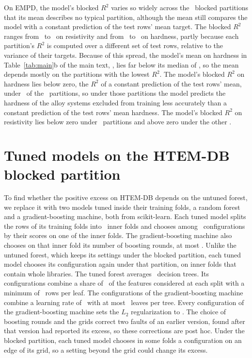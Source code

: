 \documentclass[11pt]{article}
\begin{document}
On EMPD, the model's blocked $R^2$ varies so widely across the \splitDraws\
blocked partitions that its mean describes no typical partition, although the
mean still compares the model with a constant prediction of the test rows' mean
target. The blocked $R^2$ ranges from \empdResBlockedMin\ to
\empdResBlockedMax\ on resistivity and from \empdHardBlockedMin\ to
\empdHardBlockedMax\ on hardness, partly because each partition's $R^2$ is
computed over a different set of test rows, relative to the variance of their
targets. Because of this spread, the model's mean on hardness in
Table~\ref{tab:main}b of the main text, \empdHardBlocked, lies far below its
median of \empdHardBlockedMedian, so the mean depends mostly on the partitions
with the lowest $R^2$. The model's blocked $R^2$ on hardness lies below zero, the
$R^2$ of a constant prediction of the test rows' mean, under
\empdHardBlockedNegative\ of the \splitDraws\ partitions, so under those
partitions the model predicts the hardness of the alloy systems excluded from
training less accurately than a constant prediction of the test rows' mean
hardness. The model's blocked $R^2$ on resistivity lies below zero under
\empdResBlockedNegative\ partitions and above zero under the other
\empdResBlockedPositive.

\section{Tuned models on the HTEM-DB blocked partition}
\label{sec:esi-posthoc}

To find whether the positive excess on HTEM-DB depends on the untuned forest, we
replace it with two models tuned inside their training folds, a random forest and
a gradient-boosting machine, both from scikit-learn. Each tuned model splits the
rows of its training folds into \htemInnerFolds\ inner folds and chooses among
\htemSearchBudget\ configurations by their scores on one of the inner folds. The
gradient-boosting machine also chooses on that inner fold its number of boosting
rounds, at most \htemBoostRounds. Unlike the untuned forest, which keeps its
settings under the blocked partition, each tuned model chooses its configuration
again under that partition, on inner folds that contain whole libraries. The
tuned forest averages \htemTunedTrees\ decision trees. Its configurations combine
a share of \htemForestFeatureShares\ of the features considered at each split with
a minimum of \htemForestMinLeaf\ rows per leaf. The configurations of the
gradient-boosting machine combine a learning rate of \htemBoostRates\ with at most
\htemBoostLeaves\ leaves per tree. Every configuration of the gradient-boosting
machine sets the $L_2$ regularization to \htemBoostPenalty. The choice of boosting
rounds and the grids correct two faults of an earlier version, found after that
version had reported its excess, so these corrections are post hoc. Under the
blocked partition, each tuned model chooses in some folds a configuration on an
edge of its grid, so a setting beyond the grid could change its excess.
\end{document}

